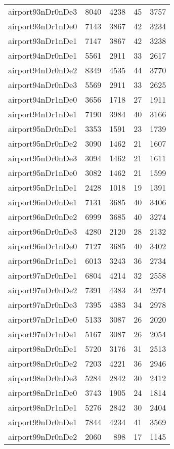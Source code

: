 \documentclass[../../../thesis.tex]{subfiles}
\begin{document}
\begin{longtable}{lrrrr}
airport93nDr0nDe3 & 8040 & 4238 & 45 & 3757 \\
airport93nDr1nDe0 & 7143 & 3867 & 42 & 3234 \\
airport93nDr1nDe1 & 7147 & 3867 & 42 & 3238 \\
airport94nDr0nDe1 & 5561 & 2911 & 33 & 2617 \\
airport94nDr0nDe2 & 8349 & 4535 & 44 & 3770 \\
airport94nDr0nDe3 & 5569 & 2911 & 33 & 2625 \\
airport94nDr1nDe0 & 3656 & 1718 & 27 & 1911 \\
airport94nDr1nDe1 & 7190 & 3984 & 40 & 3166 \\
airport95nDr0nDe1 & 3353 & 1591 & 23 & 1739 \\
airport95nDr0nDe2 & 3090 & 1462 & 21 & 1607 \\
airport95nDr0nDe3 & 3094 & 1462 & 21 & 1611 \\
airport95nDr1nDe0 & 3082 & 1462 & 21 & 1599 \\
airport95nDr1nDe1 & 2428 & 1018 & 19 & 1391 \\
airport96nDr0nDe1 & 7131 & 3685 & 40 & 3406 \\
airport96nDr0nDe2 & 6999 & 3685 & 40 & 3274 \\
airport96nDr0nDe3 & 4280 & 2120 & 28 & 2132 \\
airport96nDr1nDe0 & 7127 & 3685 & 40 & 3402 \\
airport96nDr1nDe1 & 6013 & 3243 & 36 & 2734 \\
airport97nDr0nDe1 & 6804 & 4214 & 32 & 2558 \\
airport97nDr0nDe2 & 7391 & 4383 & 34 & 2974 \\
airport97nDr0nDe3 & 7395 & 4383 & 34 & 2978 \\
airport97nDr1nDe0 & 5133 & 3087 & 26 & 2020 \\
airport97nDr1nDe1 & 5167 & 3087 & 26 & 2054 \\
airport98nDr0nDe1 & 5720 & 3176 & 31 & 2513 \\
airport98nDr0nDe2 & 7203 & 4221 & 36 & 2946 \\
airport98nDr0nDe3 & 5284 & 2842 & 30 & 2412 \\
airport98nDr1nDe0 & 3743 & 1905 & 24 & 1814 \\
airport98nDr1nDe1 & 5276 & 2842 & 30 & 2404 \\
airport99nDr0nDe1 & 7844 & 4234 & 41 & 3569 \\
airport99nDr0nDe2 & 2060 & 898 & 17 & 1145 \\

\end{longtable}
\end{document}

